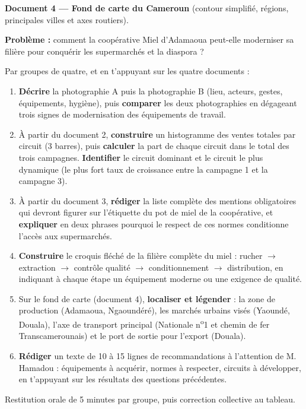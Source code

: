 \documentclass[11pt]{article}
\newcounter{popsec}
\newcounter{popsub}
\newcommand{\courssub}[1]{%
  \stepcounter{popsub}%
  \par\vspace{9pt}\noindent{\popxbold\fontsize{11.5}{13}\selectfont\color{popink}{\color{poporange}\thepopsec.\thepopsub}\hspace{6pt}#1}\par\nopagebreak\vspace{4pt}
}
\begin{document}
\textbf{Document 4 — Fond de carte du Cameroun} (contour simplifié, régions, principales villes et axes routiers).

\textbf{Problème :} comment la coopérative \og Miel d'Adamaoua \fg{} peut-elle moderniser sa filière pour conquérir les supermarchés et la diaspora ?

\courssub{Consignes}

Par groupes de quatre, et en t'appuyant sur les quatre documents :

\begin{enumerate}
\item \textbf{Décrire} la photographie A puis la photographie B (lieu, acteurs, gestes, équipements, hygiène), puis \textbf{comparer} les deux photographies en dégageant trois signes de modernisation des équipements de travail.
\item À partir du document 2, \textbf{construire} un histogramme des ventes totales par circuit (3 barres), puis \textbf{calculer} la part de chaque circuit dans le total des trois campagnes. \textbf{Identifier} le circuit dominant et le circuit le plus dynamique (le plus fort taux de croissance entre la campagne 1 et la campagne 3).
\item À partir du document 3, \textbf{rédiger} la liste complète des mentions obligatoires qui devront figurer sur l'étiquette du pot de miel de la coopérative, et \textbf{expliquer} en deux phrases pourquoi le respect de ces normes conditionne l'accès aux supermarchés.
\item \textbf{Construire} le croquis fléché de la filière complète du miel : rucher $\rightarrow$ extraction $\rightarrow$ contrôle qualité $\rightarrow$ conditionnement $\rightarrow$ distribution, en indiquant à chaque étape un équipement moderne ou une exigence de qualité.
\item Sur le fond de carte (document 4), \textbf{localiser et légender} : la zone de production (Adamaoua, Ngaoundéré), les marchés urbains visés (Yaoundé, Douala), l'axe de transport principal (Nationale n\textsuperscript{o}1 et chemin de fer Transcamerounais) et le port de sortie pour l'export (Douala).
\item \textbf{Rédiger} un texte de 10 à 15 lignes de recommandations à l'attention de M. Hamadou : équipements à acquérir, normes à respecter, circuits à développer, en t'appuyant sur les résultats des questions précédentes.
\end{enumerate}

Restitution orale de 5 minutes par groupe, puis correction collective au tableau.
\end{document}
